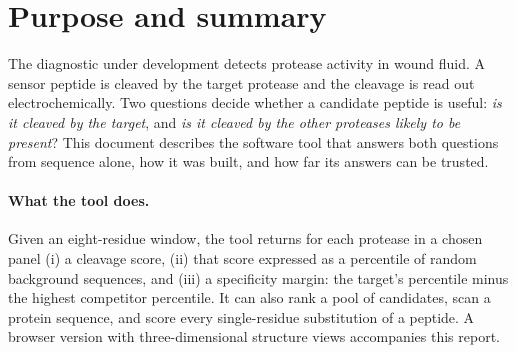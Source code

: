 \section{Purpose and summary}
\label{sec:intro}

The diagnostic under development detects protease activity in wound fluid. A sensor peptide is cleaved by the target protease and the cleavage is read out electrochemically. Two questions decide whether a candidate peptide is useful: \emph{is it cleaved by the target}, and \emph{is it cleaved by the other proteases likely to be present}? This document describes the software tool that answers both questions from sequence alone, how it was built, and how far its answers can be trusted.

\paragraph{What the tool does.} Given an eight-residue window, the tool returns for each protease in a chosen panel (i) a cleavage score, (ii) that score expressed as a percentile of random background sequences, and (iii) a specificity margin: the target's percentile minus the highest competitor percentile. It can also rank a pool of candidates, scan a protein sequence, and score every single-residue substitution of a peptide. A browser version with three-dimensional structure views accompanies this report.

